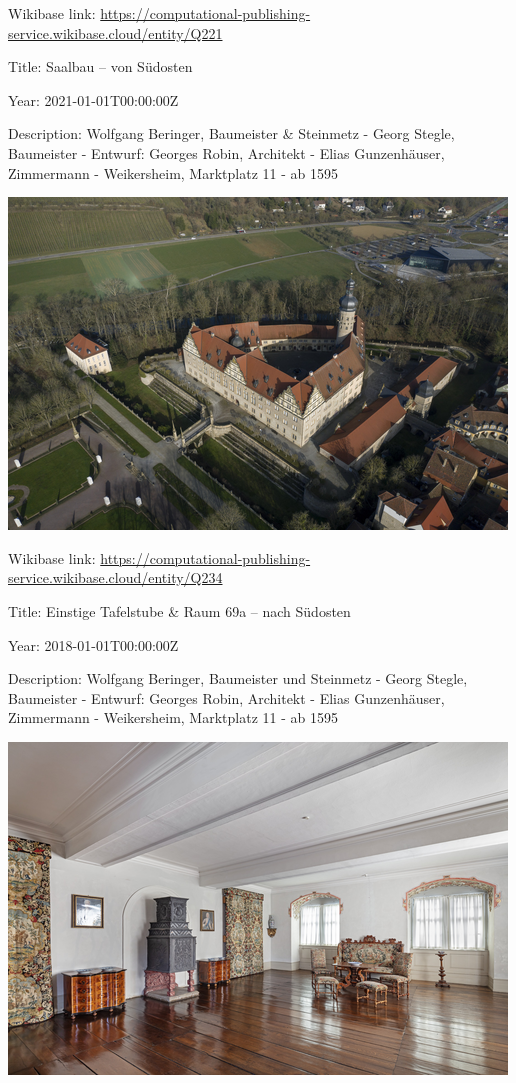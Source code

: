\documentclass[
  letterpaper,
]{book}
\begin{document}
Wikibase link:
\url{https://computational-publishing-service.wikibase.cloud/entity/Q221}

Title: Saalbau -- von Südosten

Year: 2021-01-01T00:00:00Z

Description: Wolfgang Beringer, Baumeister \& Steinmetz - Georg Stegle,
Baumeister - Entwurf: Georges Robin, Architekt - Elias Gunzenhäuser,
Zimmermann - Weikersheim, Marktplatz 11 - ab 1595

\includegraphics{paintings_files/figure-pdf/cell-3-output-76.png}

Wikibase link:
\url{https://computational-publishing-service.wikibase.cloud/entity/Q234}

Title: Einstige Tafelstube \& Raum 69a -- nach Südosten

Year: 2018-01-01T00:00:00Z

Description: Wolfgang Beringer, Baumeister und Steinmetz - Georg Stegle,
Baumeister - Entwurf: Georges Robin, Architekt - Elias Gunzenhäuser,
Zimmermann - Weikersheim, Marktplatz 11 - ab 1595

\includegraphics{paintings_files/figure-pdf/cell-3-output-78.png}
\end{document}
